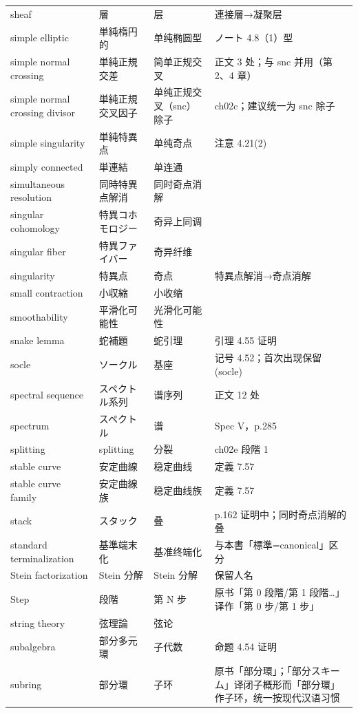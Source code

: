 \begin{longtable}{@{}>{\raggedright\arraybackslash}p{}>{\raggedright\arraybackslash}p{}>{\raggedright\arraybackslash}p{}>{\raggedright\arraybackslash}p{}@{}}
sheaf & 層 & 层 & 連接層→凝聚层 \\
simple elliptic & 単純楕円的 & 单纯椭圆型 & ノート 4.8（1）型 \\
simple normal crossing & 単純正規交差 & 简单正规交叉 & 正文 3 处；与 snc 并用（第 2、4 章） \\
simple normal crossing divisor & 単純正規交叉因子 & 单纯正规交叉（snc）除子 & ch02c；建议统一为 snc 除子 \\
simple singularity & 単純特異点 & 单纯奇点 & 注意 4.21(2) \\
simply connected & 単連結 & 单连通 &  \\
simultaneous resolution & 同時特異点解消 & 同时奇点消解 &  \\
singular cohomology & 特異コホモロジー & 奇异上同调 &  \\
singular fiber & 特異ファイバー & 奇异纤维 &  \\
singularity & 特異点 & 奇点 & 特異点解消→奇点消解 \\
small contraction & 小収縮 & 小收缩 &  \\
smoothability & 平滑化可能性 & 光滑化可能性 & 7.78 \\
snake lemma & 蛇補題 & 蛇引理 & 引理 4.55 证明 \\
socle & ソークル & 基座 & 记号 4.52；首次出现保留 (socle) \\
spectral sequence & スペクトル系列 & 谱序列 & 正文 12 处 \\
spectrum & スペクトル & 谱 & Spec V，p.285 \\
splitting & splitting & 分裂 & ch02e 段階 1 \\
stable curve & 安定曲線 & 稳定曲线 & 定義 7.57 \\
stable curve family & 安定曲線族 & 稳定曲线族 & 定義 7.57 \\
stack & スタック & 叠 & p.162 证明中；同时奇点消解的叠 \\
standard terminalization & 基準端末化 & 基准终端化 & 与本書「標準=canonical」区分 \\
Stein factorization & Stein 分解 & Stein 分解 & 保留人名 \\
Step & 段階 & 第 N 步 & 原书「第 0 段階/第 1 段階…」译作「第 0 步/第 1 步」 \\
string theory & 弦理論 & 弦论 & 7.78 \\
subalgebra & 部分多元環 & 子代数 & 命题 4.54 证明 \\
subring & 部分環 & 子环 & 原书「部分環」；「部分スキーム」译闭子概形而「部分環」作子环，统一按现代汉语习惯 \\

\end{longtable}
